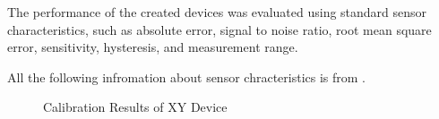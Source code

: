 The performance of the created devices was evaluated using standard sensor characteristics, such as absolute error, signal to noise ratio, root mean square error, sensitivity, hysteresis, and measurement range.

All the following infromation about sensor chracteristics is from \cite{kalantar-zadeh_sensors_2013}.

\begin{figure}[h]%
\label{fig:XY_calib_res}%
\centering
{}%
\qquad
{}%
\caption{Calibration Results of XY Device}
\end{figure}

